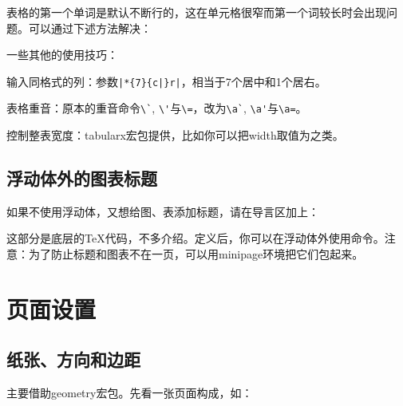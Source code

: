 {表格的第一个单词是默认不断行的，这在单元格很窄而第一个词较长时会出现问题。可以通过下述方法解决：


一些其他的使用技巧：
\begin{feae}
\item 输入同格式的列：参数\verb+|*{7}{c|}r|+，相当于7个居中和1个居右。
\item 表格重音：原本的重音命令\verb|\`|, \verb|\'|与\verb|\=|，改为\verb|\a`|, \verb|\a'|与\verb|\a=|。
\item 控制整表宽度：tabularx宏包提供，比如你可以把width取值为之类。
\end{feae}

\subsection{浮动体外的图表标题}
如果不使用浮动体，又想给图、表添加标题，请在导言区加上：
\begin{latex}{}
\makeatletter
\newcommand\figcaption{\def\@captype{figure}\caption}
\newcommand\tabcaption{\def\@captype{table}\caption}
\makeatother
\end{latex}

这部分是底层的\TeX 代码，不多介绍。定义后，你可以在浮动体外使用命令。注意：为了防止标题和图表不在一页，可以用minipage环境把它们包起来。

\section{页面设置}

\subsection{纸张、方向和边距}
主要借助geometry宏包。先看一张页面构成，如：
\begin{figure}
\centering

\label{fig:geo-paper}
\end{figure}

}
